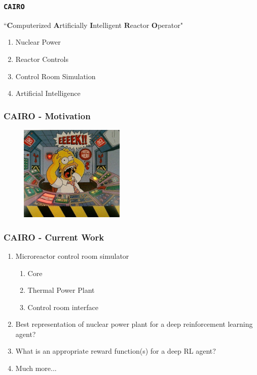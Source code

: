 	\begin{frame}
		\frametitle{\texttt{CAIRO}}
		``$\textbf{C}$omputerized $\textbf{A}$rtificially $\textbf{I}$ntelligent $\textbf{R}$eactor $\textbf{O}$perator"\\
		\begin{enumerate}
			\item Nuclear Power
			\item Reactor Controls
			\item Control Room Simulation
			\item Artificial Intelligence
		\end{enumerate}
	\end{frame}

	\begin{frame}
		\frametitle{CAIRO - Motivation}
		\begin{figure}
			\includegraphics[width=5cm]{homer-reactor.jpg}
		\end{figure}
	\end{frame}
	\begin{frame}
		\frametitle{CAIRO - Current Work}
		\begin{enumerate}
			\item Microreactor control room simulator
			\begin{enumerate}
				\item Core
				\item Thermal Power Plant
				\item Control room interface
			\end{enumerate}
			\item Best representation of nuclear power plant for a deep reinforcement learning agent?
			\item What is an appropriate reward function(s) for a deep RL agent?
			\item Much more... 
		\end{enumerate}
	\end{frame}



% 
